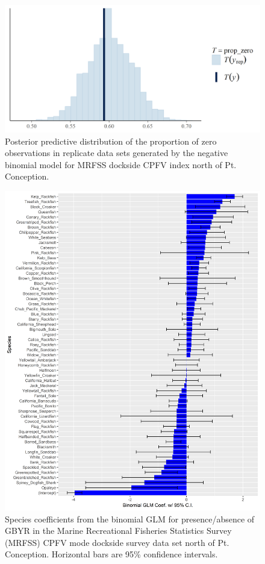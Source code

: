 \documentclass[12pt,]{article}
\begin{document}
\begin{figure}
\centering
\includegraphics{Figures/Fleet10_prop_zero_STAN.png}
\caption{Posterior predictive distribution of the proportion of zero
observations in replicate data sets generated by the negative binomial
model for MRFSS dockside CPFV index north of Pt. Conception.
\label{fig:Fleet10_prop_zero_STAN}}
\end{figure}

\FloatBarrier

\begin{figure}
\centering
\includegraphics{Figures/Fleet11_SM_filter.png}
\caption{Species coefficients from the binomial GLM for presence/absence
of GBYR in the Marine Recreational Fisheries Statistics Survey (MRFSS)
CPFV mode dockside survey data set north of Pt. Conception. Horizontal
bars are 95\% confidence intervals. \label{fig:Fleet11_SM_filter}}
\end{figure}
\end{document}
